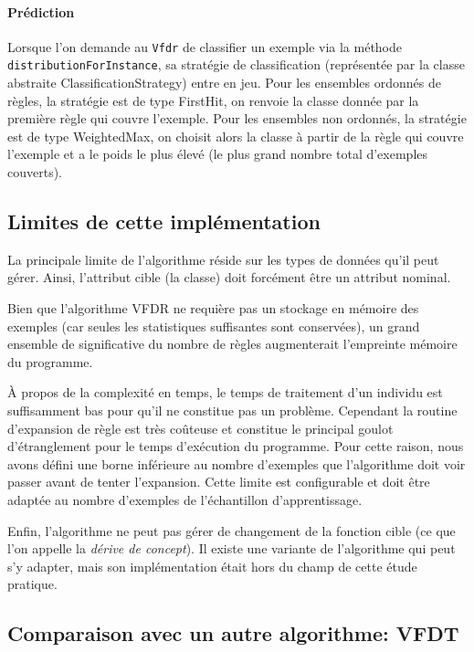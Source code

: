         \paragraph{Prédiction} Lorsque l’on demande au \texttt{Vfdr} de classifier un exemple via la méthode \texttt{distributionForInstance}, sa stratégie de classification (représentée par la classe abstraite ClassificationStrategy) entre en jeu. Pour les ensembles ordonnés de règles, la stratégie est de type FirstHit, on renvoie la classe donnée par la première règle qui couvre l’exemple. Pour les ensembles non ordonnés, la stratégie est de type WeightedMax, on choisit alors la classe à partir de la règle qui couvre l’exemple et a le poids le plus élevé (le plus grand nombre total d’exemples couverts).

    \subsection{Limites de cette implémentation}

        La principale limite de l’algorithme réside sur les types de données qu’il peut gérer. Ainsi, l’attribut cible (la classe) doit forcément être un attribut nominal.

        Bien que l’algorithme VFDR ne requière pas un stockage en mémoire des exemples (car seules les statistiques suffisantes sont conservées), un grand ensemble de significative du nombre de règles augmenterait l'empreinte mémoire du programme.

        À propos de la complexité en temps, le temps de traitement d'un individu est suffisamment bas pour qu'il ne constitue pas un problème. Cependant la routine d'expansion de règle est très coûteuse et constitue le principal goulot d'étranglement pour le temps d'exécution du programme. Pour cette raison, nous avons défini une borne inférieure au nombre d'exemples que l'algorithme doit voir passer avant de tenter l'expansion. Cette limite est configurable et doit être adaptée au nombre d'exemples de l'échantillon d'apprentissage.

        Enfin, l’algorithme ne peut pas gérer de changement de la fonction cible (ce que l'on appelle la \emph{dérive de concept}). Il existe une variante de l'algorithme qui peut s'y adapter, mais son implémentation était hors du champ de cette étude pratique.


    \subsection{Comparaison avec un autre algorithme: VFDT}


